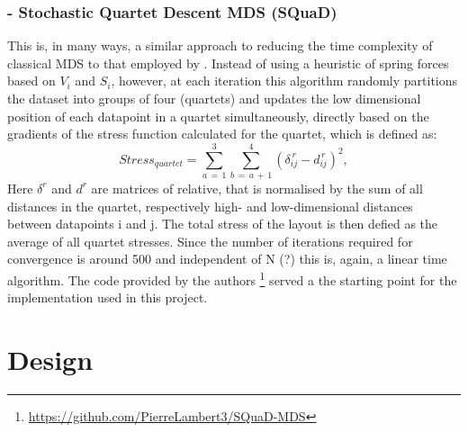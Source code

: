 \documentclass{l4proj}
\begin{document}
\subsection{\cite{squad} - Stochastic Quartet Descent MDS (SQuaD)}

This is, in many ways, a similar approach to reducing the time complexity of classical MDS to that employed by \citet{Chalmers96}. Instead of using a heuristic of spring forces based on $V_i$ and $S_i$, however, at each iteration this algorithm randomly partitions the dataset into groups of four (quartets) and updates the low dimensional position of each datapoint in a quartet simultaneously, directly based on the gradients of the stress function calculated for the quartet, which is defined as:
\begin{equation}
\label{tab:quartet_stress}
    Stress_{quartet} = \sum_{a\, =\, 1}^{3} \sum_{b\, =\, a\, +\, 1}^{4} (\delta_{ij}^{\,r} - d_{ij}^{\,r})^2,
\end{equation} 
Here $\delta^{r}$ and $d^{r}$ are matrices of relative, that is normalised by the sum of all distances in the quartet, respectively high- and low-dimensional distances between datapoints i and j. The total stress of the layout is then defied as the average of all quartet stresses. Since the number of iterations required for convergence is around 500 and independent of N (?) this is, again, a linear time algorithm. The code provided by the authors \footnote{ \url{https://github.com/PierreLambert3/SQuaD-MDS}} served a the starting point for the implementation used in this project.


\chapter{Design}
\end{document}
